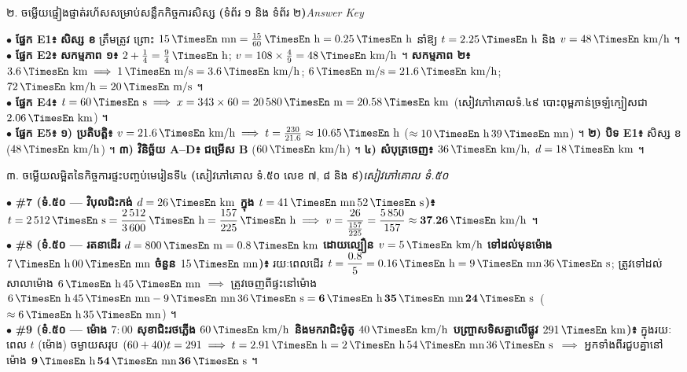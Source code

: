 \documentclass[a4paper,10pt]{article}
\newcommand{\en}[1]{{\TimesEn #1}}
\newcommand{\enbf}[1]{{\TimesEn\bfseries #1}}
\newcommand{\unit}[1]{\,\text{\en{#1}}}
\newcommand{\secstrip}[2]{%
  \vspace{3pt}%
  \begin{tcolorbox}[
    enhanced, sharp corners, colback=panelgray, colframe=black,
    boxrule=0.8pt, boxsep=0.8pt, top=2pt, bottom=2pt, left=5pt, right=5pt,
    after skip=3pt
  ]
    {\muol\fontsize{8.5pt}{12.2pt}\selectfont #1}\hfill{\fontsize{7.8pt}{10.8pt}\selectfont\textit{#2}}
  \end{tcolorbox}%
}
\begin{document}
\vspace{4pt}
\secstrip{២. ចម្លើយផ្ទៀងផ្ទាត់រហ័សសម្រាប់សន្លឹកកិច្ចការសិស្ស \enbf{(}ទំព័រ ១ និង ទំព័រ ២\enbf{)}}{\en{Answer Key}}

\begin{tcolorbox}[
  enhanced, sharp corners, colback=white, colframe=black,
  boxrule=0.8pt, boxsep=2pt, top=4pt, bottom=4pt, left=6pt, right=6pt
]
  \fontsize{9.0pt}{13.5pt}\selectfont
  $\bullet$ \textbf{ផ្នែក \en{E1}៖} \textbf{សិស្ស ខ} ត្រឹមត្រូវ ព្រោះ $15\unit{mn} = \frac{15}{60}\unit{h} = 0.25\unit{h}$ នាំឱ្យ $t = 2.25\unit{h}$ និង $v = 48\unit{km/h}$ ។\\[2pt]
  $\bullet$ \textbf{ផ្នែក \en{E2}៖} \textbf{សកម្មភាព ១៖} $2 + \frac{1}{4} = \frac{9}{4}\unit{h}$; $v = 108\times \frac{4}{9} = 48\unit{km/h}$ ។ \textbf{សកម្មភាព ២៖} $3.6\unit{km} \implies 1\unit{m/s} = 3.6\unit{km/h}$; $6\unit{m/s} = 21.6\unit{km/h}$; $72\unit{km/h} = 20\unit{m/s}$ ។\\[2pt]
  $\bullet$ \textbf{ផ្នែក \en{E4}៖} $t = 60\unit{s} \implies x = 343\times 60 = 20\,580\unit{m} = 20.58\unit{km}$ (សៀវភៅគោលទំ.៤៩ បោះពុម្ពភាន់ច្រឡំក្បៀសជា $2.06\unit{km}$) ។\\[2pt]
  $\bullet$ \textbf{ផ្នែក \en{E5}៖} \textbf{១) ប្រតិបត្តិ៖} $v = 21.6\unit{km/h} \implies t = \frac{230}{21.6} \approx 10.65\unit{h}$ ($\approx 10\unit{h}\,39\unit{mn}$) ។ \textbf{២) បិទ \en{E1}៖} សិស្ស ខ ($48\unit{km/h}$) ។ \textbf{៣) វិនិច្ឆ័យ \en{A--D}៖} \textbf{ជម្រើស \en{B}} ($60\unit{km/h}$) ។ \textbf{៤) សំបុត្រចេញ៖} $36\unit{km/h}, \ d = 18\unit{km}$ ។
\end{tcolorbox}

\vspace{4pt}
\secstrip{៣. ចម្លើយលម្អិតនៃកិច្ចការផ្ទះបញ្ចប់មេរៀនទី៤ \enbf{(}សៀវភៅគោល ទំ.៥០ លេខ ៧, ៨ និង ៩\enbf{)}}{សៀវភៅគោល ទំ.៥០}

\begin{tcolorbox}[
  enhanced, sharp corners, colback=white, colframe=black,
  boxrule=0.8pt, boxsep=2pt, top=4pt, bottom=4pt, left=6pt, right=6pt
]
  \fontsize{8.7pt}{13.0pt}\selectfont
  $\bullet$ \textbf{\#7 (ទំ.៥០ — វិបុលជិះកង់ $d = 26\unit{km}$ ក្នុង $t = 41\unit{mn}\,52\unit{s}$)៖} $t = 2\,512\unit{s} = \dfrac{2\,512}{3\,600}\unit{h} = \dfrac{157}{225}\unit{h} \implies v = \dfrac{26}{\frac{157}{225}} = \dfrac{5\,850}{157} \approx \mathbf{37.26\unit{km/h}}$ ។\\[2pt]
  $\bullet$ \textbf{\#8 (ទំ.៥០ — រតនាដើរ $d = 800\unit{m} = 0.8\unit{km}$ ដោយល្បឿន $v = 5\unit{km/h}$ ទៅដល់មុនម៉ោង $7\unit{h}\,00\unit{mn}$ ចំនួន $15\unit{mn}$)៖} រយៈពេលដើរ $t = \dfrac{0.8}{5} = 0.16\unit{h} = 9\unit{mn}\,36\unit{s}$; ត្រូវទៅដល់សាលាម៉ោង $6\unit{h}\,45\unit{mn}$ $\implies$ ត្រូវចេញពីផ្ទះនៅម៉ោង $6\unit{h}\,45\unit{mn} - 9\unit{mn}\,36\unit{s} = \mathbf{6\unit{h}\,35\unit{mn}\,24\unit{s}}$ ($\approx 6\unit{h}\,35\unit{mn}$) ។\\[2pt]
  $\bullet$ \textbf{\#9 (ទំ.៥០ — ម៉ោង $7:00$ សុខាជិះរថភ្លើង $60\unit{km/h}$ និងមករាជិះម៉ូតូ $40\unit{km/h}$ បញ្ច្រាសទិសគ្នាលើផ្លូវ $291\unit{km}$)៖} ក្នុងរយៈពេល $t$ (ម៉ោង) ចម្ងាយសរុប $(60 + 40)t = 291 \implies t = 2.91\unit{h} = 2\unit{h}\,54\unit{mn}\,36\unit{s}$ $\implies$ អ្នកទាំងពីរជួបគ្នានៅម៉ោង $\mathbf{9\unit{h}\,54\unit{mn}\,36\unit{s}}$ ។
\end{tcolorbox}
\end{document}
